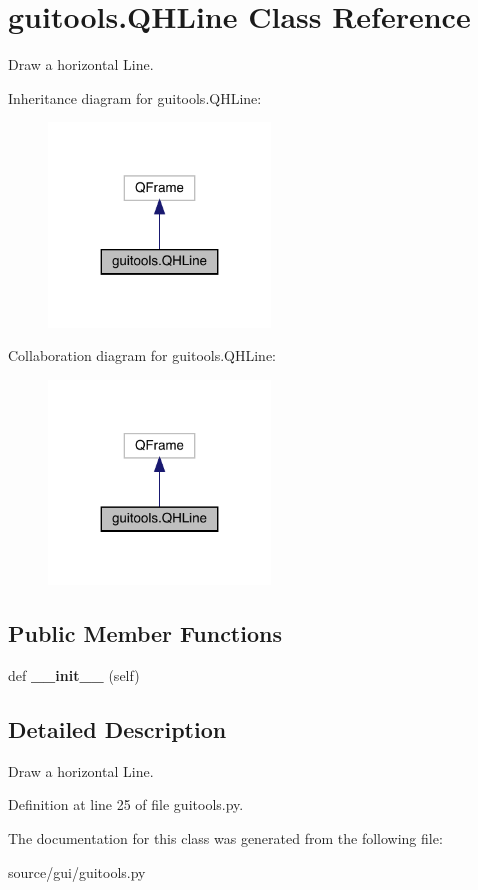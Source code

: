 \hypertarget{classguitools_1_1_q_h_line}{}\section{guitools.\+Q\+H\+Line Class Reference}
\label{classguitools_1_1_q_h_line}


Draw a horizontal Line.  




Inheritance diagram for guitools.\+Q\+H\+Line\+:\nopagebreak
\begin{figure}[H]
\begin{center}
\leavevmode
\includegraphics[width=167pt]{classguitools_1_1_q_h_line__inherit__graph}
\end{center}
\end{figure}


Collaboration diagram for guitools.\+Q\+H\+Line\+:\nopagebreak
\begin{figure}[H]
\begin{center}
\leavevmode
\includegraphics[width=167pt]{classguitools_1_1_q_h_line__coll__graph}
\end{center}
\end{figure}
\subsection*{Public Member Functions}
\begin{DoxyCompactItemize}
\item 
\mbox{\label{classguitools_1_1_q_h_line_a7d19a1526a6fcd9ea96574fb9aadc164}} 
def {\bfseries \+\_\+\+\_\+init\+\_\+\+\_\+} (self)
\end{DoxyCompactItemize}


\subsection{Detailed Description}
Draw a horizontal Line. 

Definition at line 25 of file guitools.\+py.



The documentation for this class was generated from the following file\+:\begin{DoxyCompactItemize}
\item 
source/gui/guitools.\+py\end{DoxyCompactItemize}
